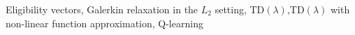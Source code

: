 Eligibility vectors, Galerkin relaxation in the \(L_2\) setting, TD\((\lambda)\),TD\((\lambda)\) with non-linear function approximation, Q-learning